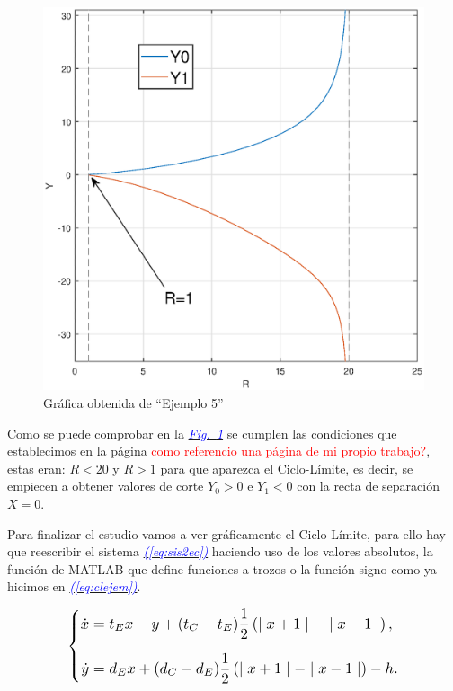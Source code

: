 \documentclass[12pt,a4paper]{report} %
\newcommand{\fref}[1]{\hyperref[#1]{\textcolor{blue}{\textit{Fig.~\ref*{#1}}}}}
\newcommand{\eref}[1]{\hyperref[#1]{\textcolor{blue}{\textit{(\ref*{#1})}}}}
\begin{document}
	\begin{figure}[h]
		\centering
		\includegraphics[width=1\textwidth]{ry1ry0.eps}
		\caption{Gráfica obtenida de ``Ejemplo 5''}
		\label{fig:ry1ry0}
	\end{figure}\smallskip
	
	\vspace{0.5cm}\noindent Como se puede comprobar en la \fref{fig:ry1ry0} se cumplen las condiciones que establecimos en la página \textcolor{red}{como referencio una página de mi propio trabajo?}, estas eran: $R<20$ y $R>1$ para que aparezca el Ciclo-Límite, es decir, se empiecen a obtener valores de corte $Y_0>0$ e $Y_1<0$ con la recta de separación $X=0$.
	
	\newpage
	
	Para finalizar el estudio vamos a ver gráficamente el Ciclo-Límite, para ello hay que reescribir el sistema \eref{eq:sis2ec} haciendo uso de los valores absolutos, la función de MATLAB que define funciones a trozos o la función signo como ya hicimos en \eref{eq:clejem}.
	
	\begin{equation}
		\label{eq:clejemsis}
		\scalebox{1.2}{$\displaystyle
			\left\{
			\begin{aligned}
				\dot{x}&=t_Ex-y+(t_C-t_E)\frac{1}{2}\left( \mid x+1 \mid - \mid x-1 \mid \right),
				\\[2mm]
				\dot{y}&=d_Ex+(d_C-d_E)\frac{1}{2}\left( \mid x+1 \mid - \mid x-1 \mid \right)-h.
			\end{aligned}
			\right. 
			$}
	\end{equation}\smallskip
	
\end{document}
